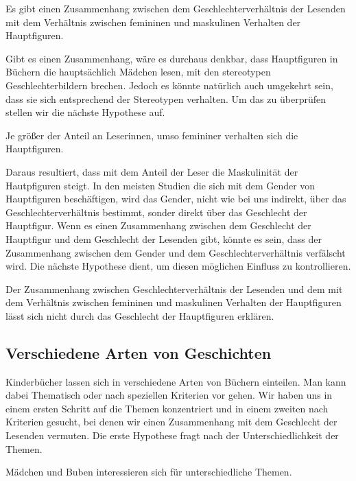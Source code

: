 \begin{hyp}
   Es gibt einen Zusammenhang zwischen dem Geschlechterverhältnis der Lesenden
    mit  dem Verhältnis zwischen femininen und maskulinen Verhalten der Hauptfiguren.
\end{hyp}

Gibt es einen Zusammenhang, wäre es durchaus denkbar, dass Hauptfiguren
in Büchern die hauptsächlich Mädchen lesen, mit den stereotypen
Geschlechterbildern brechen. Jedoch es könnte natürlich auch umgekehrt
sein, dass sie sich entsprechend der Stereotypen verhalten. Um das zu
überprüfen stellen wir die nächste Hypothese auf.

\begin{subhyp}
    Je größer der Anteil an Leserinnen, umso femininer verhalten sich die Hauptfiguren.
\end{subhyp}

Daraus resultiert, dass mit dem Anteil der Leser die Maskulinität der
Hautpfiguren steigt. In den meisten Studien die sich mit dem Gender von
Hauptfiguren beschäftigen, wird das Gender, nicht wie bei uns indirekt,
über das Geschlechterverhältnis bestimmt, sonder direkt über das
Geschlecht der Hauptfigur. Wenn es einen Zusammenhang zwischen dem
Geschlecht der Hauptfigur und dem Geschlecht der Lesenden gibt, könnte
es sein, dass der Zusammenhang zwischen dem Gender und dem
Geschlechterverhältnis verfälscht wird. Die nächste Hypothese dient, um
diesen möglichen Einfluss zu kontrollieren.

\begin{subhyp}
    Der Zusammenhang zwischen Geschlechterverhältnis der Lesenden und dem
    mit dem Verhältnis zwischen femininen und maskulinen Verhalten der Hauptfiguren lässt sich nicht durch das Geschlecht der Hauptfiguren erklären.
\end{subhyp}

\subsection{Verschiedene Arten von Geschichten}

Kinderbücher lassen sich in verschiedene Arten von Büchern einteilen.
Man kann dabei Thematisch oder nach speziellen Kriterien vor gehen. Wir
haben uns in einem ersten Schritt auf die Themen konzentriert und in
einem zweiten nach Kriterien gesucht, bei denen wir einen Zusammenhang
mit dem Geschlecht der Lesenden vermuten. Die erste Hypothese fragt nach
der Unterschiedlichkeit der Themen.

\begin{hyp}\label{hyp:themen}
    Mädchen und Buben interessieren sich für unterschiedliche Themen.
\end{hyp}

